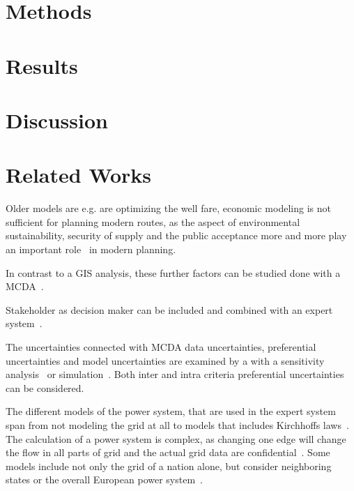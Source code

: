 \documentclass[acmtog]{acmart}
\begin{document}
	\section{Methods}\label{sec:methods}
	

	\section{Results}\label{sec:results}
	
	
	\section{Discussion}\label{sec:discussion}
	

	\section{Related Works}\label{sec:related-works}

	
	
	Older models are e.g. are optimizing the well fare, economic modeling is not sufficient for planning modern routes, as the aspect of environmental sustainability, security of supply and the public acceptance more and more play an important role~\cite{hauff_gesellschaftliche_2011} in modern planning.
	
	In contrast to a GIS analysis, these further factors can be studied done with a \acrfull{MCDA}~\cite{bertsch_participatory_2016}.

	Stakeholder as decision maker can be included and combined with an expert system~\cite{bertsch_participatory_2016}.
	
	The uncertainties connected with \acrshort{MCDA} data uncertainties, preferential uncertainties and model uncertainties are examined by a with a sensitivity analysis~\cite{bertsch_participatory_2016} or simulation~\cite{butler_simulation_1997}.
	Both inter and intra criteria preferential uncertainties~\cite{bertsch_sensitivity_2007} can be considered.
		
	The different models of the power system, that are used in the expert system span from not modeling the grid at all to models that includes Kirchhoffs laws~\cite{bertsch_participatory_2016}.
	The calculation of a power system is complex, as changing one edge will change the flow in all parts of grid and the actual grid data are confidential~\cite{bertsch_participatory_2016}.
	Some models include not only the grid of a nation alone, but consider neighboring states or the overall European power system~\cite{dietrich_will_2010}.
\end{document}
